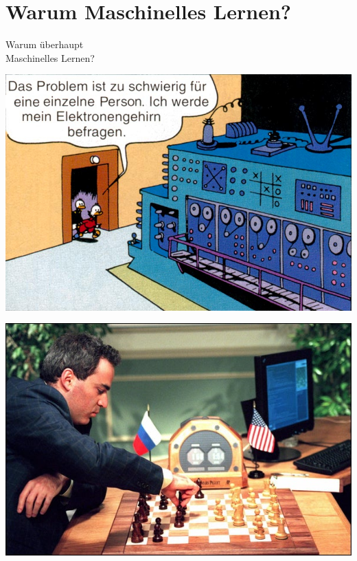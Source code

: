 \documentclass[aspectratio=43,x11names]{beamer}
\begin{document}

\section{Warum Maschinelles Lernen?}

\begin{frame}
\begin{center}
\huge
Warum überhaupt\\Maschinelles Lernen?
\end{center}
\end{frame}


\begin{frame}
\begin{center}
\includegraphics[width=\textwidth]{images/elektronengehirn} 
\end{center}
\end{frame}

\begin{frame}
\begin{center}
\includegraphics[width=\textwidth]{images/kasparov} 
\end{center}
\end{frame}
\end{document}
